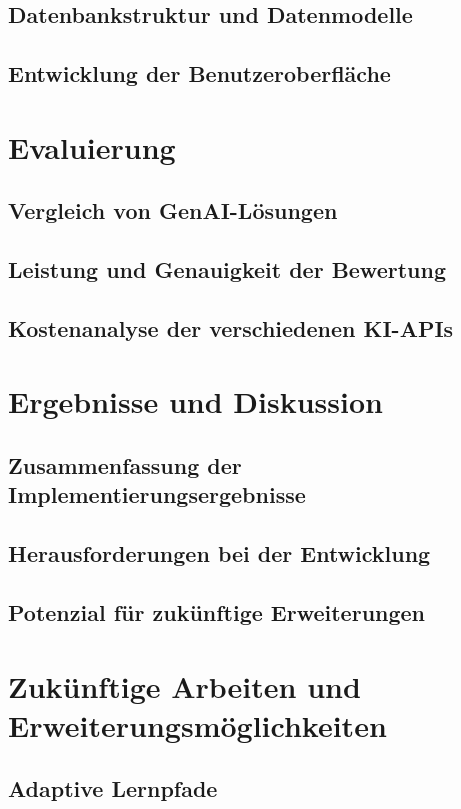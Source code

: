 \documentclass[a4paper,12pt]{article}
\begin{document}
\subsection{Datenbankstruktur und Datenmodelle}
\subsection{Entwicklung der Benutzeroberfläche}

\newpage

\section{Evaluierung}
\subsection{Vergleich von GenAI-Lösungen}
\subsection{Leistung und Genauigkeit der Bewertung}
\subsection{Kostenanalyse der verschiedenen KI-APIs}

\newpage

\section{Ergebnisse und Diskussion}
\subsection{Zusammenfassung der Implementierungsergebnisse}
\subsection{Herausforderungen bei der Entwicklung}
\subsection{Potenzial für zukünftige Erweiterungen}

\newpage

\section{Zukünftige Arbeiten und Erweiterungsmöglichkeiten}
\subsection{Adaptive Lernpfade}
\end{document}
